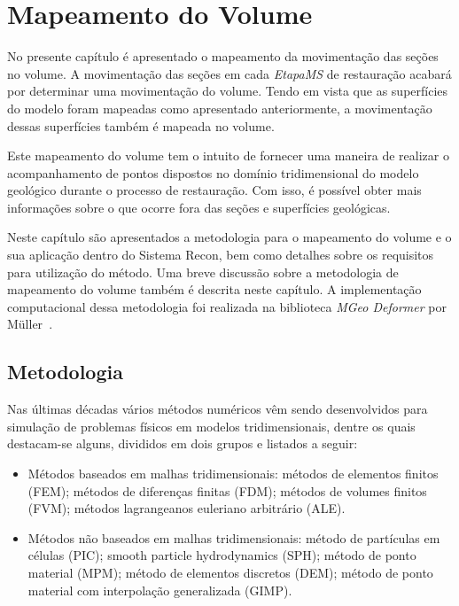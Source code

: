 
\chapter{Mapeamento do Volume}

No presente capítulo é apresentado o mapeamento da movimentação das seções no volume. A movimentação das seções em cada \emph{EtapaMS} de restauração acabará por determinar uma movimentação do volume. Tendo em vista que as superfícies do modelo foram mapeadas como apresentado anteriormente, a movimentação dessas superfícies também é mapeada no volume. 

Este mapeamento do volume tem o intuito de fornecer uma maneira de realizar o acompanhamento de pontos dispostos no domínio tridimensional do modelo geológico durante o processo de restauração. Com isso, é possível obter mais informações sobre o que ocorre fora das seções e superfícies geológicas.

Neste capítulo são apresentados a metodologia para o mapeamento do volume e o sua aplicação dentro do Sistema Recon, bem como detalhes sobre os requisitos para utilização do método. Uma breve discussão sobre a metodologia de mapeamento do volume também é descrita neste capítulo. A implementação computacional dessa metodologia foi realizada na biblioteca \emph{MGeo Deformer} por Müller~\cite{Muller}.

\section{Metodologia}\label{vol-metodology}

Nas últimas décadas vários métodos numéricos vêm sendo desenvolvidos para simulação de problemas físicos em modelos tridimensionais, dentre os quais destacam-se alguns, divididos em dois grupos e listados a seguir:

\renewcommand{\labelitemi}{•}
\begin{itemize}
  \item Métodos baseados em malhas tridimensionais: métodos de elementos finitos (FEM)\cite{MEF}; métodos de diferenças finitas (FDM)\cite{MDF}; métodos de volumes finitos (FVM)\cite{MVF}; métodos lagrangeanos euleriano arbitrário (ALE)\cite{ALE}.
  \item Métodos não baseados em malhas tridimensionais: método de partículas em células (PIC)\cite{PIC}; smooth particle hydrodynamics (SPH)\cite{SPH}; método de ponto material (MPM)\cite{MPM}; método de elementos discretos (DEM)\cite{DEM}; método de ponto material com interpolação generalizada (GIMP)\cite{GIMP,MullerGIMP}.
\end{itemize}

